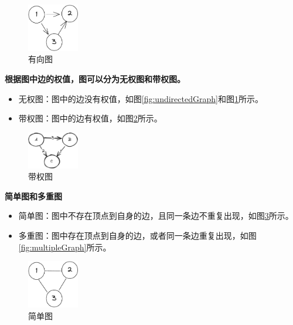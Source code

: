 \documentclass[lang=cn,newtx,10pt,scheme=chinese]{elegantbook}
\begin{document}
  \begin{figure}[h!]
    \centering
    \includegraphics[width=0.2\textwidth]{./figure/pdf/cropped/direction.pdf}
    \caption{有向图}
    \label{fig:directedGraph}

  \end{figure}

  \textbf{根据图中边的权值，图可以分为无权图和带权图。}

  \begin{itemize}
    \item 无权图：图中的边没有权值，如图\ref{fig:undirectedGraph}和图\ref{fig:directedGraph}所示。
    \item 带权图：图中的边有权值，如图\ref{fig:weightedGraph}所示。
    \end{itemize}

    \begin{figure}[h!]
      \centering
      \includegraphics[width=0.2\textwidth]{./figure/pdf/cropped/weightedGraph.pdf}
      \caption{带权图}
      \label{fig:weightedGraph}
    \end{figure}

\textbf{简单图和多重图}

\begin{itemize}
  \item 简单图：图中不存在顶点到自身的边，且同一条边不重复出现，如图\ref{fig:simpleGraph}所示。
  \item 多重图：图中存在顶点到自身的边，或者同一条边重复出现，如图\ref{fig:multipleGraph}所示。
  \end{itemize}

  \begin{figure}[h!]
    \centering
    \includegraphics[width=0.2\textwidth]{./figure/pdf/cropped/unDirection.pdf}
    \caption{简单图}
    \label{fig:simpleGraph}
  \end{figure}
\end{document}
